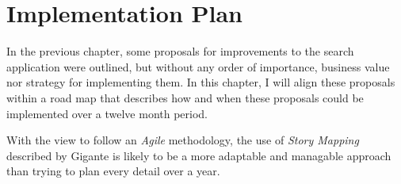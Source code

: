 \chapter{Implementation Plan}

In the previous chapter, some proposals for improvements to
the search application were outlined, but without any order
of importance, business value nor strategy for implementing them.
In this chapter, I will align these proposals within a road map
that describes how and when these proposals could be implemented
over a twelve month period.

With the view to follow an \emph{Agile} methodology, the use
of \emph{Story Mapping} described by Gigante\cite{gigante2013creating}
is likely to be a more adaptable and managable approach than
trying to plan every detail over a year.

